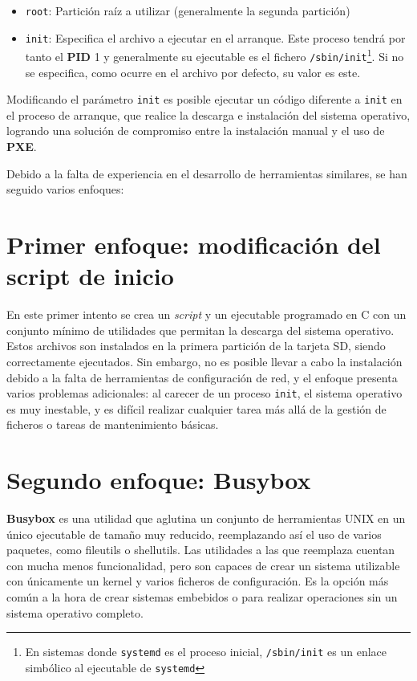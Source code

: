 \documentclass{article}
\begin{document}
\begin{itemize}
	\item \texttt{root}: Partición raíz a utilizar (generalmente la segunda partición)
	\item \texttt{init}: Especifica el archivo a ejecutar en el arranque. Este proceso tendrá por tanto el \textbf{PID} 1 y generalmente su ejecutable es el fichero \texttt{/sbin/init}\footnote{En sistemas donde \texttt{systemd} es el proceso inicial, \texttt{/sbin/init} es un enlace simbólico al ejecutable de \texttt{systemd}}. Si no se especifica, como ocurre en el archivo por defecto, su valor es este\cite{kernelparams:init}.
\end{itemize}

Modificando el parámetro \texttt{init} es posible ejecutar un código diferente a \texttt{init} en el proceso de arranque, que realice la descarga e instalación del sistema operativo, logrando una solución de compromiso entre la instalación manual y el uso de \textbf{PXE}.

Debido a la falta de experiencia en el desarrollo de herramientas similares, se han seguido varios enfoques:

\section{Primer enfoque: modificación del script de inicio}

En este primer intento se crea un \textit{script} y un ejecutable programado en C con un conjunto mínimo de utilidades que permitan la descarga del sistema operativo. Estos archivos son instalados en la primera partición de la tarjeta SD, siendo correctamente ejecutados. Sin embargo, no es posible llevar a cabo la instalación debido a la falta de herramientas de configuración de red, y el enfoque presenta varios problemas adicionales: al carecer de un proceso \texttt{init}, el sistema operativo es muy inestable, y es difícil realizar cualquier tarea más allá de la gestión de ficheros o tareas de mantenimiento básicas.

\section{Segundo enfoque: Busybox}

\textbf{Busybox} es una utilidad que aglutina un conjunto de herramientas UNIX en un único ejecutable de tamaño muy reducido, reemplazando así el uso de varios paquetes, como fileutils o shellutils. Las utilidades a las que reemplaza cuentan con mucha menos funcionalidad, pero son capaces de crear un sistema utilizable con únicamente un kernel y varios ficheros de configuración\cite{aboutbusybox}. Es la opción más común a la hora de crear sistemas embebidos o para realizar operaciones sin un sistema operativo completo.
\end{document}
